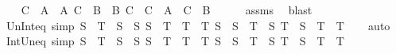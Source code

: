 \begin{isabellebody}
%
\isadelimproof
%
\endisadelimproof
%
\isatagproof
{}\isamarkupfalse%
\isanewline
\ \ \isamarkupfalse%
\ {\isachardoublequoteopen}C\ {\isasyminter}\ A\ {\isasymsubseteq}\ A{\isachardoublequoteclose}\ {\isachardoublequoteopen}C\ {\isasyminter}\ B\ {\isasymsubseteq}\ B{\isachardoublequoteclose}\ {\isachardoublequoteopen}C\ {\isacharequal}{\kern0pt}\ {\isacharparenleft}{\kern0pt}C\ {\isasyminter}\ A{\isacharparenright}{\kern0pt}\ {\isasymunion}\ {\isacharparenleft}{\kern0pt}C\ {\isasyminter}\ B{\isacharparenright}{\kern0pt}{\isachardoublequoteclose}\isanewline
\ \ \ \ \isamarkupfalse%
\ assms\ \isamarkupfalse%
\ blast{\isacharplus}{\kern0pt}\isanewline
{}\isamarkupfalse%
%
\endisatagproof
{\isafoldproof}%
%
\isadelimproof
\isanewline
%
\endisadelimproof
\isanewline
{}\isamarkupfalse%
\ Un{\isacharunderscore}{\kern0pt}Int{\isacharunderscore}{\kern0pt}eq\ {\isacharbrackleft}{\kern0pt}simp{\isacharbrackright}{\kern0pt}{\isacharcolon}{\kern0pt}\ {\isachardoublequoteopen}{\isacharparenleft}{\kern0pt}S\ {\isasymunion}\ T{\isacharparenright}{\kern0pt}\ {\isasyminter}\ S\ {\isacharequal}{\kern0pt}\ S{\isachardoublequoteclose}\ {\isachardoublequoteopen}{\isacharparenleft}{\kern0pt}S\ {\isasymunion}\ T{\isacharparenright}{\kern0pt}\ {\isasyminter}\ T\ {\isacharequal}{\kern0pt}\ T{\isachardoublequoteclose}\ {\isachardoublequoteopen}S\ {\isasyminter}\ {\isacharparenleft}{\kern0pt}S\ {\isasymunion}\ T{\isacharparenright}{\kern0pt}\ {\isacharequal}{\kern0pt}\ S{\isachardoublequoteclose}\ {\isachardoublequoteopen}T\ {\isasyminter}\ {\isacharparenleft}{\kern0pt}S\ {\isasymunion}\ T{\isacharparenright}{\kern0pt}\ {\isacharequal}{\kern0pt}\ T{\isachardoublequoteclose}\isanewline
%
\isadelimproof
\ \ %
\endisadelimproof
%
\isatagproof
{}\isamarkupfalse%
\ auto%
\endisatagproof
{\isafoldproof}%
%
\isadelimproof
\isanewline
%
\endisadelimproof
\isanewline
{}\isamarkupfalse%
\ Int{\isacharunderscore}{\kern0pt}Un{\isacharunderscore}{\kern0pt}eq\ {\isacharbrackleft}{\kern0pt}simp{\isacharbrackright}{\kern0pt}{\isacharcolon}{\kern0pt}\ {\isachardoublequoteopen}{\isacharparenleft}{\kern0pt}S\ {\isasyminter}\ T{\isacharparenright}{\kern0pt}\ {\isasymunion}\ S\ {\isacharequal}{\kern0pt}\ S{\isachardoublequoteclose}\ {\isachardoublequoteopen}{\isacharparenleft}{\kern0pt}S\ {\isasyminter}\ T{\isacharparenright}{\kern0pt}\ {\isasymunion}\ T\ {\isacharequal}{\kern0pt}\ T{\isachardoublequoteclose}\ {\isachardoublequoteopen}S\ {\isasymunion}\ {\isacharparenleft}{\kern0pt}S\ {\isasyminter}\ T{\isacharparenright}{\kern0pt}\ {\isacharequal}{\kern0pt}\ S{\isachardoublequoteclose}\ {\isachardoublequoteopen}T\ {\isasymunion}\ {\isacharparenleft}{\kern0pt}S\ {\isasyminter}\ T{\isacharparenright}{\kern0pt}\ {\isacharequal}{\kern0pt}\ T{\isachardoublequoteclose}\isanewline

\end{isabellebody}
